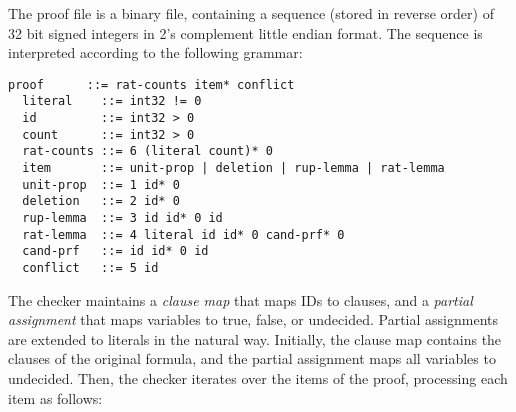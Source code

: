 \documentclass{llncs}     %
\begin{document}
The proof file is a binary file, containing a sequence (stored in reverse order) of 32 bit signed integers in 2's complement little endian format.
The sequence is interpreted according to the following grammar:
\begin{lstlisting}[language={},columns={[c]fullflexible},literate={}]
  proof      ::= rat-counts item* conflict
  literal    ::= int32 != 0
  id         ::= int32 > 0
  count      ::= int32 > 0
  rat-counts ::= 6 (literal count)* 0
  item       ::= unit-prop | deletion | rup-lemma | rat-lemma
  unit-prop  ::= 1 id* 0
  deletion   ::= 2 id* 0
  rup-lemma  ::= 3 id id* 0 id
  rat-lemma  ::= 4 literal id id* 0 cand-prf* 0
  cand-prf   ::= id id* 0 id
  conflict   ::= 5 id
\end{lstlisting}

The checker maintains a \emph{clause map} that maps IDs to clauses, and a \emph{partial assignment} that maps variables to true, false, or undecided.
Partial assignments are extended to literals in the natural way.
Initially, the clause map contains the clauses of the original formula, and the partial assignment maps all variables to undecided.
Then, the checker iterates over the items of the proof, processing each item as follows:
\end{document}
